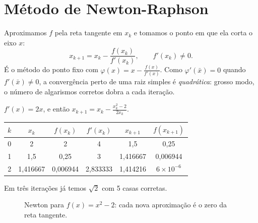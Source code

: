 \section{Método de Newton-Raphson}

Aproximamos $f$ pela reta tangente em $x_k$ e tomamos o ponto em que ela corta o eixo $x$:
\[
x_{k+1}=x_k-\frac{f(x_k)}{f'(x_k)},\qquad f'(x_k)\neq0.
\]
É o método do ponto fixo com $\varphi(x)=x-\frac{f(x)}{f'(x)}$. Como $\varphi'(\bar x)=0$ quando
$f'(\bar x)\neq0$, a convergência perto de uma raiz simples é \emph{quadrática}: grosso modo, o
número de algarismos corretos dobra a cada iteração.

\begin{exemplo}[{: três iterações para $f(x)=x^2-2$ com $x_0=2$}]
$f'(x)=2x$, e então $x_{k+1}=x_k-\frac{x_k^2-2}{2x_k}$.
\begin{center}
\begin{tabular}{cccccc}
\toprule
$k$ & $x_k$ & $f(x_k)$ & $f'(x_k)$ & $x_{k+1}$ & $f(x_{k+1})$\\
\midrule
0 & 2 & 2 & 4 & 1{,}5 & 0{,}25\\
1 & 1{,}5 & 0{,}25 & 3 & 1{,}416667 & 0{,}006944\\
2 & 1{,}416667 & 0{,}006944 & 2{,}833333 & 1{,}414216 & $6\times10^{-6}$\\
\bottomrule
\end{tabular}
\end{center}
Em três iterações já temos $\sqrt2$ com 5 casas corretas.
\end{exemplo}

\begin{figure}[h]
\centering
{}
\caption{Newton para $f(x)=x^2-2$: cada nova aproximação é o zero da reta tangente.}
\end{figure}

